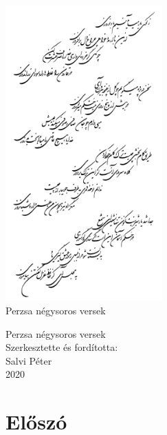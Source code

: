 

\frontmatter
{}

\begin{titlepage}
\centering
\includegraphics[width=6cm]{hafez.png}\\
\vspace{\fill}
{\LARGE Perzsa négysoros versek}
\end{titlepage}

\thispagestyle{empty}
\newpage

\begin{titlepage}
\centering
\vspace*{2cm}
{\Large Perzsa négysoros versek}\\
\vspace{7cm}
{\large Szerkesztette és fordította:}\\
\vspace{1em}
{\large Salvi Péter}\\
\vspace{1em}
2020
\end{titlepage}





\thispagestyle{empty}
\newpage

\chapter*{Előszó}


